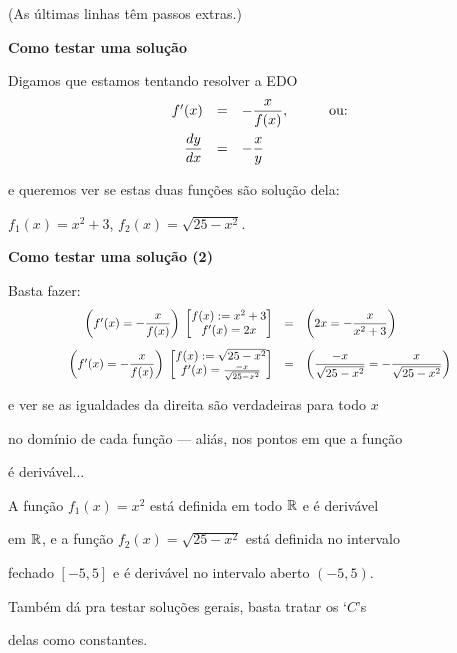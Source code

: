 \documentclass[oneside,12pt]{article}
\begin{document}
(As últimas linhas têm passos extras.)


\newpage


{\bf Como testar uma solução}

Digamos que estamos tentando resolver a EDO
%
$$\begin{array}{rcll}
  f'(x) &=& \displaystyle -\frac{x}{f(x)}, & \qquad\text{ou:} \\[10pt]
  \displaystyle \frac{dy}{dx} &=& \displaystyle -\frac{x}{y}  \\
  \end{array}
$$

e queremos ver se estas duas funções são solução dela:

$f_1(x) = x^2 + 3$, $f_2(x) = \sqrt{25-x^2}$.

\newpage

{\bf Como testar uma solução (2)}

Basta fazer:
%
$$\scalebox{0.85}{$
  \begin{array}{rcll}
  \left( f'(x) = \D -\frac{x}{f(x)} \right)
  \; \bmat{ f(x) := x^2 + 3 \\ f'(x) = 2x }
  &=&
  \left( 2x = \D -\frac{x}{x^2+3} \right)
  \\[15pt]
  \left( f'(x) = \D -\frac{x}{f(x)} \right)
  \; \bmat{ f(x) := \sqrt{25-x^2} \\ f'(x) = \frac{-x}{\sqrt{25-x^2}} }
  &=&
  \left( \D \frac{-x}{\sqrt{25-x^2}} = \D -\frac{x}{\sqrt{25-x^2}} \right)
  \\
  \end{array}
  $}
$$

e ver se as igualdades da direita são verdadeiras para todo $x$

no domínio de cada função --- aliás, nos pontos em que a função

é derivável...

\msk

A função $f_1(x)=x^2$ está definida em todo $\mathbb{R}$ e é derivável

em $\mathbb{R}$, e a função $f_2(x) = \sqrt{25-x^2}$ está definida no intervalo

fechado $[-5,5]$ e é derivável no intervalo aberto $(-5,5)$.

\msk

Também dá pra testar soluções gerais, basta tratar os `$C$'s

delas como constantes.
\end{document}
